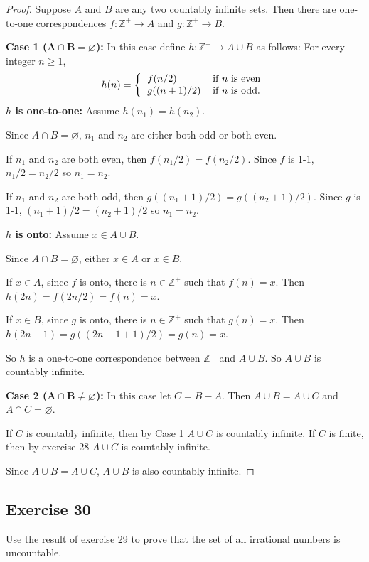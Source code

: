 \documentclass[14pt]{extarticle}
\newcommand{\es}{\varnothing}
\newcommand{\Z}{\mathbb{Z}}
\begin{document}
\begin{proof}
Suppose $A$ and $B$ are any two countably infinite sets. Then there are one-to-one correspondences \(f: \Z^+ \to A\) and \(g: \Z^+ \to B\).

{\bf Case 1 (\(\bm{A \cap B = \es}\)):} In this case define \(h: \Z^+ \to A \cup B\) as follows: For every integer \(n \geq 1\),
\[
h(n) =
\left\{
\begin{tabular}{ll}
\(f(n/2)\) & if $n$ is even \\
\(g((n+1)/2)\) & if $n$ is odd.
\end{tabular}
\right.
\]
{\bf $h$ is one-to-one:} Assume \(h(n_1) = h(n_2)\). 

Since \(A \cap B = \es\), $n_1$ and $n_2$ are either both odd or both even.

If $n_1$ and $n_2$ are both even, then \(f(n_1/2) =f(n_2/2)\). Since $f$ is 1-1, \(n_1/2 = n_2/2\) so \(n_1 = n_2\). 

If $n_1$ and $n_2$ are both odd, then \(g((n_1+1)/2) = g((n_2+1)/2)\). Since $g$ is 1-1, \((n_1+1)/2 = (n_2+1)/2\) 
so \(n_1 = n_2\).

{\bf $h$ is onto:} Assume \(x \in A \cup B\). 

Since \(A \cap B = \es\), either \(x \in A\) or \(x \in B\).

If \(x \in A\), since $f$ is onto, there is $n \in \Z^+$ such that \(f(n) = x\). Then \(h(2n) = f(2n/2) =f(n) = x\).

If \(x \in B\), since $g$ is onto, there is $n \in \Z^+$ such that \(g(n) = x\). 
Then \(h(2n-1) = g((2n-1+1)/2) = g(n) = x\).

So $h$ is a one-to-one correspondence between \(\Z^+\) and \(A \cup B\). So \(A \cup B\) is countably infinite.

{\bf Case 2 (\(\bm{A \cap B \neq \es}\)):} In this case let \(C = B - A\). Then \(A \cup B = A \cup C\) and \(A \cap C 
= \es\). 

If $C$ is countably infinite, then by Case 1 \(A \cup C\) is countably infinite. If $C$ is finite, then by exercise 
28 \(A \cup C\) is countably infinite.

Since \(A \cup B = A \cup C\), \(A \cup B\) is also countably infinite.
\end{proof}

\subsection{Exercise 30}
Use the result of exercise 29 to prove that the set of all irrational numbers is uncountable.
\end{document}
